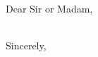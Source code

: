 \documentclass[a4paper,11pt]{article}
\begin{document}

\vspace{40mm}

\contactinfo

Dear Sir or Madam,
\noindent


~\\
\flushleft
Sincerely, \\ \vspace{15mm}
\who
\end{document}

